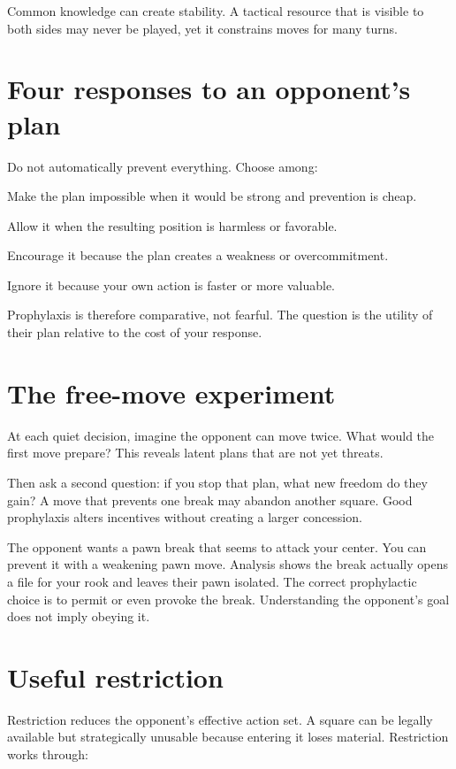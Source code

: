 Common knowledge can create stability. A tactical resource that is visible to both sides may never be played, yet it constrains moves for many turns.

\section{Four responses to an opponent's plan}
Do not automatically prevent everything. Choose among:

\begin{description}[style=nextline,leftmargin=2.4em,labelsep=.5em]
\item[Stop.] Make the plan impossible when it would be strong and prevention is cheap.
\item[Permit.] Allow it when the resulting position is harmless or favorable.
\item[Provoke.] Encourage it because the plan creates a weakness or overcommitment.
\item[Race.] Ignore it because your own action is faster or more valuable.
\end{description}

Prophylaxis is therefore comparative, not fearful. The question is the utility of their plan relative to the cost of your response.

\section{The free-move experiment}
At each quiet decision, imagine the opponent can move twice. What would the first move prepare? This reveals latent plans that are not yet threats.

Then ask a second question: if you stop that plan, what new freedom do they gain? A move that prevents one break may abandon another square. Good prophylaxis alters incentives without creating a larger concession.

\begin{workedbox}[title={Worked example: invite the break}]
The opponent wants a pawn break that seems to attack your center. You can prevent it with a weakening pawn move. Analysis shows the break actually opens a file for your rook and leaves their pawn isolated. The correct prophylactic choice is to permit or even provoke the break. Understanding the opponent's goal does not imply obeying it.
\end{workedbox}

\section{Useful restriction}
Restriction reduces the opponent's effective action set. A square can be legally available but strategically unusable because entering it loses material. Restriction works through:

